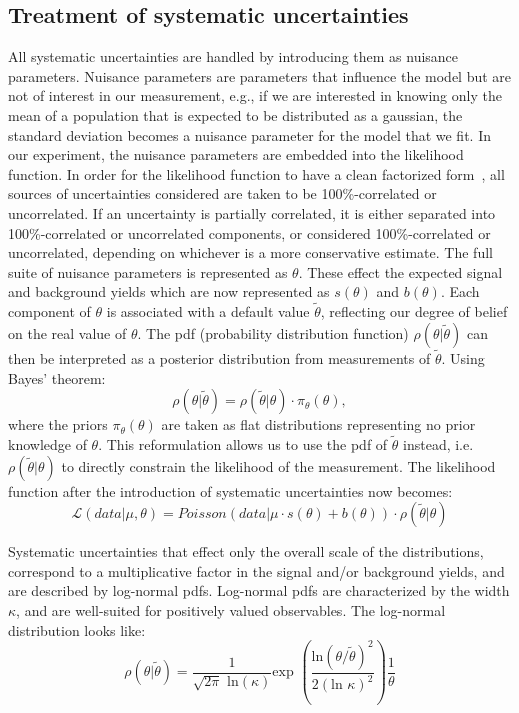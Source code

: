 \subsection{Treatment of systematic uncertainties}
\label{sys_treat}
All systematic uncertainties are handled by introducing them as nuisance parameters. Nuisance parameters are parameters that influence the model but are not of interest in our measurement, e.g., if we are interested in knowing only the mean of a population that is expected to be distributed as a gaussian, the standard deviation becomes a nuisance parameter for the model that we fit. In our experiment, the nuisance parameters are embedded into the likelihood function. In order for the likelihood function to have a clean factorized form~\cite{note2011}, all sources of uncertainties considered are taken to be 100\%-correlated or uncorrelated. If an uncertainty is partially correlated, it is either separated into 100\%-correlated or uncorrelated components, or considered 100\%-correlated or uncorrelated, depending on whichever is a more conservative estimate. The full suite of nuisance parameters is represented as $\theta$. These effect the expected signal and background yields which are now represented as $s(\theta)$ and $b(\theta)$. Each component of $\theta$ is associated with a default value $\tilde{\theta}$, reflecting our degree of belief on the real value of $\theta$. The pdf (probability distribution function) $\rho(\theta|\tilde{\theta})$ can then be interpreted as a posterior distribution from measurements of $\tilde{\theta}$. Using Bayes' theorem:
\begin{equation}
  \rho(\theta|\tilde{\theta})=\rho(\tilde{\theta}|\theta)\cdot\pi_\theta(\theta),
\end{equation}
where the priors $\pi_\theta(\theta)$ are taken as flat distributions representing no prior knowledge of $\theta$. This reformulation allows us to use the pdf of $\tilde{\theta}$ instead, i.e. $\rho(\tilde{\theta}|\theta)$  to directly constrain the likelihood of the measurement. The likelihood function after the introduction of systematic uncertainties now becomes:
\begin{equation}
  \mathcal{L}(data|\mu,\theta)=Poisson(data|\mu\cdot s(\theta) + b(\theta))\cdot\rho(\tilde{\theta}|\theta)
\end{equation}

Systematic uncertainties that effect only the overall scale of the distributions, correspond to a multiplicative factor in the signal and/or background yields, and are described by log-normal pdfs. Log-normal pdfs are characterized by the width $\kappa$, and are well-suited for positively valued observables. The log-normal distribution looks like:
\begin{equation}
\rho(\theta|\tilde{\theta})=\frac{1}{\sqrt{2\pi}\text{ ln}(\kappa)}\text{exp }(\frac{\text{ln}(\theta/\tilde{\theta})^2}{2(\text{ln }\kappa)^2}) \frac{1}{\theta}  
\end{equation}

